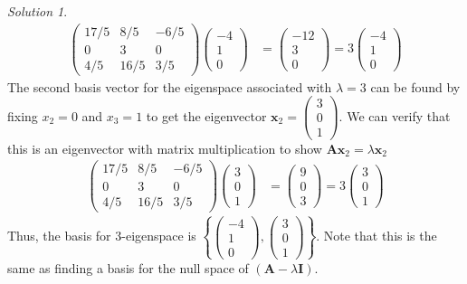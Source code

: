 \documentclass[
]{book}
\theoremstyle{definition}
\theoremstyle{definition}
\theoremstyle{definition}
\theoremstyle{definition}
\theoremstyle{remark}
\newtheorem*{solution}{Solution}
\begin{document}
\begin{solution}
\[
\begin{aligned}
\begin{pmatrix} 17/5 & 8/5 & -6/5 \\ 0 & 3 & 0 \\ 4/5 & 16/5 & 3/5 \end{pmatrix} \begin{pmatrix} -4 \\ 1 \\ 0 \end{pmatrix} & = \begin{pmatrix} -12 \\ 3 \\ 0 \end{pmatrix}  = 3 \begin{pmatrix} -4 \\ 1 \\ 0 \end{pmatrix}
\end{aligned}
\]
The second basis vector for the eigenspace associated with \(\lambda = 3\) can be found by fixing \(x_2 = 0\) and \(x_3 = 1\) to get the eigenvector \(\mathbf{x}_2 = \begin{pmatrix} 3 \\ 0 \\ 1 \end{pmatrix}\). We can verify that this is an eigenvector with matrix multiplication to show \(\mathbf{A} \mathbf{x}_2 = \lambda \mathbf{x}_2\)
\[
\begin{aligned}
\begin{pmatrix} 17/5 & 8/5 & -6/5 \\ 0 & 3 & 0 \\ 4/5 & 16/5 & 3/5 \end{pmatrix} \begin{pmatrix} 3 \\ 0 \\ 1 \end{pmatrix} & = \begin{pmatrix} 9 \\ 0 \\ 3 \end{pmatrix}  = 3 \begin{pmatrix} 3 \\ 0 \\ 1 \end{pmatrix}
\end{aligned}
\]
Thus, the basis for 3-eigenspace is \(\left\{ \begin{pmatrix} -4 \\ 1 \\ 0 \end{pmatrix}, \begin{pmatrix} 3 \\ 0 \\ 1 \end{pmatrix}\right\}\). Note that this is the same as finding a basis for the null space of \(\left(\mathbf{A} - \lambda \mathbf{I} \right)\).


\end{solution}
\end{document}
